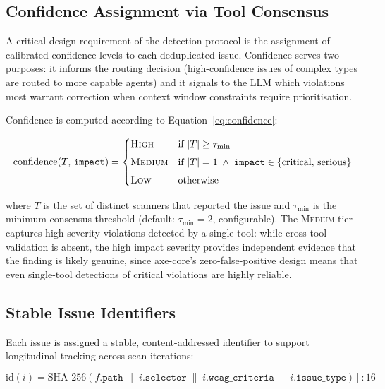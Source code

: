 \subsection{Confidence Assignment via Tool Consensus}

A critical design requirement of the detection protocol is the assignment of
calibrated confidence levels to each deduplicated issue.  Confidence serves
two purposes: it informs the routing decision (high-confidence issues of
complex types are routed to more capable agents) and it signals to the LLM
which violations most warrant correction when context window constraints
require prioritisation.

Confidence is computed according to Equation~\ref{eq:confidence}:

\begin{equation}
  \mathrm{confidence}(T,\,\texttt{impact}) =
  \begin{cases}
    \textsc{High}   & \text{if } |T| \geq \tau_{\min} \\[4pt]
    \textsc{Medium} & \text{if } |T| = 1 \;\wedge\; \texttt{impact}
                      \in \{\text{critical},\, \text{serious}\} \\[4pt]
    \textsc{Low}    & \text{otherwise}
  \end{cases}
  \label{eq:confidence}
\end{equation}

\noindent
where $T$ is the set of distinct scanners that reported the issue and
$\tau_{\min}$ is the minimum consensus threshold (default: $\tau_{\min} = 2$,
configurable).  The \textsc{Medium} tier captures high-severity violations
detected by a single tool: while cross-tool validation is absent, the high
impact severity provides independent evidence that the finding is likely
genuine, since axe-core's zero-false-positive design \cite{axe} means that
even single-tool detections of critical violations are highly reliable.

\subsection{Stable Issue Identifiers}

Each issue is assigned a stable, content-addressed identifier to support
longitudinal tracking across scan iterations:

\begin{equation}
  \mathrm{id}(i) = \mathrm{SHA\text{-}256}\!\left(
    f.\texttt{path} \;\|\; i.\texttt{selector} \;\|\;
    i.\texttt{wcag\_criteria} \;\|\; i.\texttt{issue\_type}
  \right)[{:}16]
  \label{eq:issue_id}
\end{equation}

